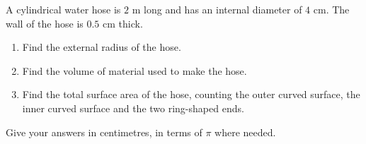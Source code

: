 A cylindrical water hose is $2$ m long and has an internal diameter of $4$ cm. The wall of the hose is $0.5$ cm thick.
\begin{enumerate}
\item[(a)] Find the external radius of the hose.
\item[(b)] Find the volume of material used to make the hose.
\item[(c)] Find the total surface area of the hose, counting the outer curved surface, the inner curved surface and the two ring-shaped ends.
\end{enumerate}
Give your answers in centimetres, in terms of $\pi$ where needed.
